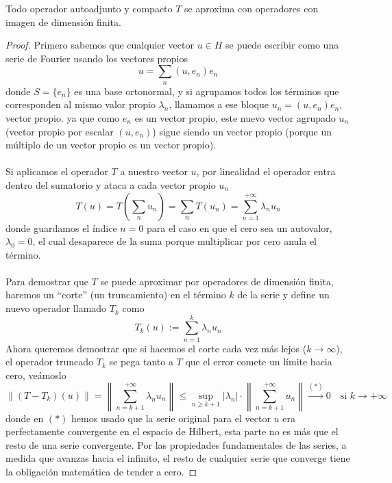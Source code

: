 \begin{prop}
    Todo operador autoadjunto y compacto $T$ se aproxima con operadores con imagen de dimensión finita.
\begin{proof}
    Primero sabemos que cualquier vector $u \in H$ se puede escribir como una serie de Fourier usando los vectores propios
    $$u = \sum_{n} ( u, e_n ) e_n$$
    donde $S=\{e_n\}$ es una base ortonormal, y si agrupamos todos los términos que corresponden al mismo valor propio $\lambda_n$, llamamos a ese bloque $u_n = ( u, e_n ) e_n$, vector propio. ya que como $e_n$ es un vector propio, este nuevo vector agrupado $u_n$ (vector propio por escalar $(u,e_n)$) sigue siendo un vector propio (porque un múltiplo de un vector propio es un vector propio). \\ \\
    \noindent
    Si aplicamos el operador $T$ a nuestro vector $u$, por linealidad el operador entra dentro del sumatorio y ataca a cada vector propio $u_n$
    $$T(u) = T\left(\sum_{n} u_n\right) = \sum_{n} T(u_n) = \sum_{n=1}^{+\infty} \lambda_n u_n$$
    donde guardamos el índice $n=0$ para el caso en que el cero sea un autovalor, $\lambda_0 = 0$, el cual desaparece de la suma porque multiplicar por cero anula el término. \\ \\
    \noindent
    Para demostrar que $T$ se puede aproximar por operadores de dimensión finita, haremos un ``corte'' (un truncamiento) en el término $k$ de la serie y define un nuevo operador llamado $T_k$ como
    $$T_k(u) := \sum_{n=1}^{k} \lambda_n u_n$$
    Ahora queremos demostrar que si hacemos el corte cada vez más lejos ($k \to \infty$), el operador truncado $T_k$ se pega tanto a $T$ que el error comete un límite hacia cero, veámoslo
    \begin{equation*}
        \|(T - T_k)(u)\| = \left\| \sum_{n=k+1}^{+\infty} \lambda_n u_n \right\| \leq \sup_{n \geq k+1} |\lambda_n| \cdot \left\| \sum_{n=k+1}^{+\infty} u_n \right\| \overset{(*)}{\longrightarrow} 0 \quad \text{si } k \to +\infty
    \end{equation*}
    donde en $(*)$ hemos usado que la serie original para el vector $u$ era perfectamente convergente en el espacio de Hilbert, esta parte no es más que el resto de una serie convergente. Por las propiedades fundamentales de las series, a medida que avanzas hacia el infinito, el resto de cualquier serie que converge tiene la obligación matemática de tender a cero.
\end{proof}
\end{prop}


